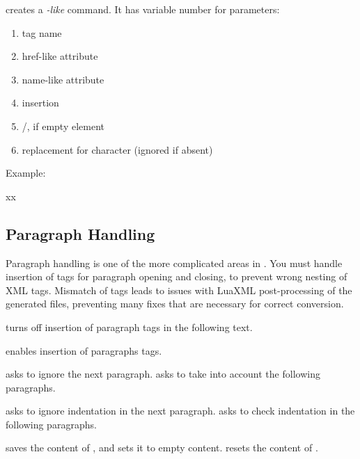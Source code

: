  creates a \textit{-like} command. It has variable number for parameters:

\begin{enumerate}
  \item tag name
  \item href-like attribute
  \item name-like attribute
  \item insertion
  \item /, if empty element
  \item replacement for \texcommand{#} character  (ignored if absent)
\end{enumerate}

Example:

\begin{texsource}
\LinkCommand{}
\def\jsref="#1"{href="javascript:window.open('#1')"}

xx\EndJSLink %
\EndLink       %
\end{texsource}


\subsection{Paragraph Handling}
\label{sec:paragraph_handling}

Paragraph handling is one of the more complicated areas in \texfourht.
You must handle insertion of tags for paragraph opening and closing,
to prevent wrong nesting of XML tags. Mismatch of tags leads to issues with 
LuaXML post-processing of the generated files, preventing many fixes 
that are necessary for correct conversion.

 turns off insertion of paragraph tags in the following text.

 enables insertion of paragraphs tags.

 asks to ignore the next paragraph.
 asks to take into account the following paragraphs.

  asks to ignore indentation in the next paragraph.
    asks to check indentation in the following paragraphs.

  saves the content of , and sets it to empty content.
 resets the content of .

